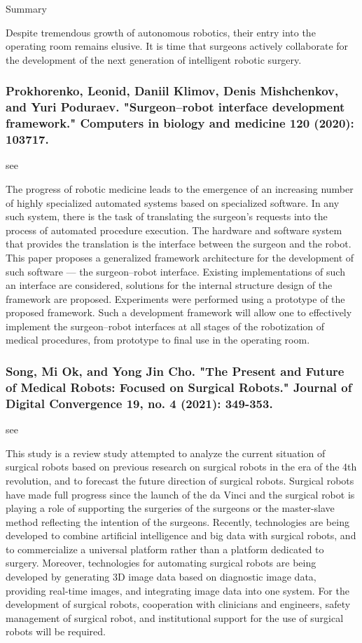 \documentclass[conference]{IEEEtran}
\begin{document}
Summary 

Despite tremendous growth of autonomous robotics, their entry into the operating room remains elusive. It is time that surgeons actively collaborate for the development of the next generation of intelligent robotic surgery.

\medskip
\subsubsection{Prokhorenko, Leonid, Daniil Klimov, Denis Mishchenkov, and Yuri Poduraev. "Surgeon–robot interface development framework." Computers in biology and medicine 120 (2020): 103717.}
see \cite{prokhorenko2020surgeon}

The progress of robotic medicine leads to the emergence of an increasing number of highly specialized automated systems based on specialized software. In any such system, there is the task of translating the surgeon’s requests into the process of automated procedure execution. The hardware and software system that provides the translation is the interface between the surgeon and the robot. This paper proposes a generalized framework architecture for the development of such software — the surgeon–robot interface. Existing implementations of such an interface are considered, solutions for the internal structure design of the framework are proposed. Experiments were performed using a prototype of the proposed framework. Such a development framework will allow one to effectively implement the surgeon–robot interfaces at all stages of the robotization of medical procedures, from prototype to final use in the operating room.

\medskip
\subsubsection{Song, Mi Ok, and Yong Jin Cho. "The Present and Future of Medical Robots: Focused on Surgical Robots." Journal of Digital Convergence 19, no. 4 (2021): 349-353.}
see \cite{song2021present}

This study is a review study attempted to analyze the current situation of surgical robots based on previous research on surgical robots in the era of the 4th revolution, and to forecast the future direction of surgical robots. Surgical robots have made full progress since the launch of the da Vinci and the surgical robot is playing a role of supporting the surgeries of the surgeons or the master-slave method reflecting the intention of the surgeons. Recently, technologies are being developed to combine artificial intelligence and big data with surgical robots, and to commercialize a universal platform rather than a platform dedicated to surgery. Moreover, technologies for automating surgical robots are being developed by generating 3D image data based on diagnostic image data, providing real-time images, and integrating image data into one system. For the development of surgical robots, cooperation with clinicians and engineers, safety management of surgical robot, and institutional support for the use of surgical robots will be required.
\end{document}
